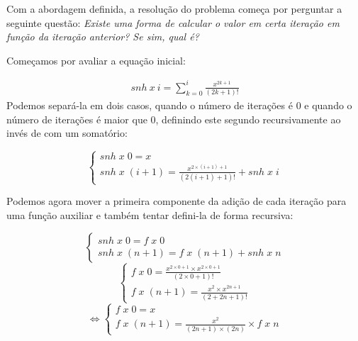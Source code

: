 \documentclass[11pt, a4paper, fleqn]{article}
\begin{document}
Com a abordagem definida, a resolução do problema começa por perguntar a seguinte questão: \textit{Existe uma forma de calcular o valor em certa 
iteração em função da iteração anterior? Se sim, qual é?}\par
Começamos por avaliar a equação inicial:

\begin{eqnarray}
	snh\ x\ i = \sum_{k=0}^i \frac{x^{2k+1}}{(2k+1)!}
\end{eqnarray}
Podemos separá-la em dois casos, quando o número de iterações é 0 e quando o número de iterações é maior que 0, definindo este segundo 
recursivamente ao invés de com um somatório:

\begin{equation}
    \begin{cases}
          snh\;x\; 0 = x \\ 
          snh\;x\;(i+1)= \frac {x^{2\times(i+1)+1}} {(2(i+1)+1)!} + snh\;x\;i
        \end{cases}
\end{equation}

Podemos agora mover a primeira componente da adição de cada iteração para uma função auxiliar e também tentar defini-la de forma recursiva:


\begin{equation}
        \begin{cases}
          snh\;x\; 0 = f\;x\;0 \\ 
          snh\;x\;(n+1)= f\;x\;(n+1) + snh\;x\;n
          \end{cases}
\end{equation}
\begin{equation}
        \begin{cases}
            f\;x\; 0 = \frac {x^{2\times0+1} \times x^{2\times0+1}} {(2\times0+1)!} \\ 
            f\;x\;(n+1) = \frac {x^{2} \times x^{2n+1}} {(2+2n+1)!} 
        \end{cases}
\end{equation}
\begin{equation}
        \Leftrightarrow
        \begin{cases}
            f\;x\; 0 = x \\ 
            f\;x\;(n+1) = \frac {x^{2}} {(2n+1) \times (2n)} \times f\;x\;n
        \end{cases}
\end{equation}
\end{document}
